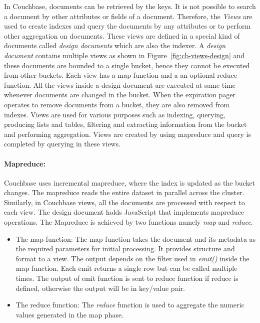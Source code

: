  In Couchbase, documents can be retrieved by the keys. It is not possible to search a document by other attributes or fields of a document.  Therefore, the \textit{Views} are used to create indexes and query the documents by any attributes or to perform other aggregation on documents. These views are defined in a special kind of documents called \textit{design documents} which are also the indexer. A \textit{design document} contains multiple views as shown in Figure~\ref{fig:cb-views-design} and these documents are bounded to a single bucket, hence they cannot be executed from other buckets. Each view has a map function and a an optional reduce function. All the views inside a design document are executed at same time whenever  documents are changed in the bucket. When the expiration pager operates to remove documents from a bucket, they are also removed from indexes. Views are used for various purposes such as indexing, querying, producing lists and tables, filtering and extracting information from the bucket and performing aggregation.  Views are created by using mapreduce and query is completed by querying in these views.
 
\paragraph{Mapreduce:} 
 Couchbase uses incremental mapreduce, where the index is updated as the bucket changes. The mapreduce reads the entire dataset in parallel across the cluster. Similarly, in Couchbase views, all the documents are processed with respect to each view. The design document holds JavaScript that implements mapreduce operations. The Mapreduce is achieved by two functions namely \textit{map} and \textit{reduce}. 
\begin{itemize}
\item {The map function:}
The map function takes the document and its metadata as the required parameters for initial processing. It provides structure and format to a view. The output depends on the filter used in \textit{emit()} inside  the map function. Each emit returns a single row but can be called multiple times. The output of emit function is sent to reduce function if reduce is defined, otherwise the output will be in key/value pair. 

\item {The reduce function:}
The \textit{reduce} function is used to aggregate the numeric values generated in the map phase.
\end{itemize}

